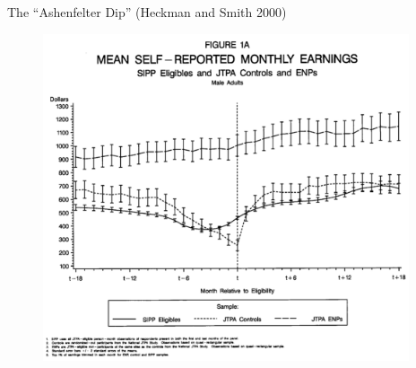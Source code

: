 \begin{frame}{The ``Ashenfelter Dip'' (Heckman and Smith 2000)}
\begin{figure}
\centering
\includegraphics[width=4.25in]{./resources/ashenfelter_dip.png}
\end{figure}
\end{frame}





